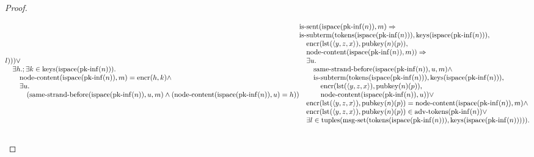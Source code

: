 \documentclass[11pt]{article}
\theoremstyle{plain}
\begin{document}
\begin{proof}
\begin{itemize}[leftmargin=2.8em, itemsep=4pt, parsep=1pt]
\begin{itemize}[leftmargin=2.8em, itemsep=4pt, parsep=1pt]
\begin{equation*}
\begin{array}{@{}l@{}}
l))) \vee \\ \quad \exists h.; \exists k \in \operatorname{keys}(\operatorname{ispace}(\operatorname{pk\text{-}inf}(n))). \\ \quad \quad \operatorname{node\text{-}content}(\operatorname{ispace}(\operatorname{pk\text{-}inf}(n)), m) = \operatorname{encr}(h, k) \wedge \\ \quad \quad \exists u. \\ \quad \quad \quad (\operatorname{same\text{-}strand\text{-}before}(\operatorname{ispace}(\operatorname{pk\text{-}inf}(n)), u, m) \wedge (\operatorname{node\text{-}content}(\operatorname{ispace}(\operatorname{pk\text{-}inf}(n)), u) = h)) \end{array} \\
\begin{array}{@{}l@{}} \operatorname{is\text{-}sent}(\operatorname{ispace}(\operatorname{pk\text{-}inf}(n)), m) \Rightarrow  \\ \operatorname{is\text{-}subterm}(\operatorname{tokens}(\operatorname{ispace}(\operatorname{pk\text{-}inf}(n))), \operatorname{keys}(\operatorname{ispace}(\operatorname{pk\text{-}inf}(n))), \\ \quad \operatorname{encr}(\operatorname{lst}(\langle y, z, x \rangle), \operatorname{pubkey}(n)(p)), \\ \quad \operatorname{node\text{-}content}(\operatorname{ispace}(\operatorname{pk\text{-}inf}(n)), m)) \Rightarrow \\ \quad \exists u. \\ \quad \quad \operatorname{same\text{-}strand\text{-}before}(\operatorname{ispace}(\operatorname{pk\text{-}inf}(n)), u, m) \wedge \\ \quad \quad \operatorname{is\text{-}subterm}(\operatorname{tokens}(\operatorname{ispace}(\operatorname{pk\text{-}inf}(n))), \operatorname{keys}(\operatorname{ispace}(\operatorname{pk\text{-}inf}(n))), \\ \quad \quad \quad \operatorname{encr}(\operatorname{lst}(\langle y, z, x \rangle), \operatorname{pubkey}(n)(p)), \\ \quad \quad \quad \operatorname{node\text{-}content}(\operatorname{ispace}(\operatorname{pk\text{-}inf}(n)), u)) \vee \\ \quad \operatorname{encr}(\operatorname{lst}(\langle y, z, x \rangle), \operatorname{pubkey}(n)(p)) = \operatorname{node\text{-}content}(\operatorname{ispace}(\operatorname{pk\text{-}inf}(n)), m) \wedge \\ \quad \operatorname{encr}(\operatorname{lst}(\langle y, z, x \rangle), \operatorname{pubkey}(n)(p)) \in \operatorname{adv\text{-}tokens}(\operatorname{pk\text{-}inf}(n)) \vee \\ \quad \exists l \in \operatorname{tuples}(\operatorname{msg\text{-}set}(\operatorname{tokens}(\operatorname{ispace}(\operatorname{pk\text{-}inf}(n))), \operatorname{keys}(\operatorname{ispace}(\operatorname{pk\text{-}inf}(n))))). \\ \quad \quad 
\end{array}
\end{equation*}
\end{itemize}
\end{itemize}
\end{proof}
\end{document}
